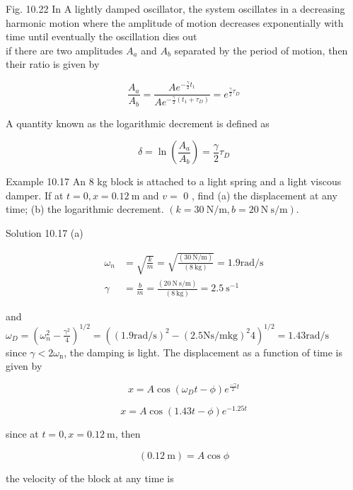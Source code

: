\documentclass[10pt]{article}
\begin{document}
Fig. 10.22 In A lightly damped oscillator, the system oscillates in a decreasing harmonic motion where the amplitude of motion decreases exponentially with time until eventually the oscillation dies out\\
if there are two amplitudes $A_{a}$ and $A_{b}$ separated by the period of motion, then their ratio is given by

$$
\frac{A_{a}}{A_{b}}=\frac{A e^{-\frac{\gamma}{2} t_{1}}}{A e^{-\frac{\gamma}{2}\left(t_{1}+\tau_{D}\right)}}=e^{\frac{\gamma}{2} \tau_{D}}
$$

A quantity known as the logarithmic decrement is defined as

$$
\delta=\ln \left(\frac{A_{a}}{A_{b}}\right)=\frac{\gamma}{2} \tau_{D}
$$

Example 10.17 An 8 kg block is attached to a light spring and a light viscous damper. If at $t=0, x=0.12 \mathrm{~m}$ and $v=$ 0 , find (a) the displacement at any time; (b) the logarithmic decrement. $(k=30 \mathrm{~N} / \mathrm{m}, b=20 \mathrm{~N} \mathrm{~s} / \mathrm{m})$.

Solution 10.17 (a)

$$
\begin{aligned}
\omega_{n} & =\sqrt{\frac{k}{m}}=\sqrt{\frac{(30 \mathrm{~N} / \mathrm{m})}{(8 \mathrm{~kg})}}=1.9 \mathrm{rad} / \mathrm{s} \\
\gamma & =\frac{b}{m}=\frac{(20 \mathrm{~N} \mathrm{~s} / \mathrm{m})}{(8 \mathrm{~kg})}=2.5 \mathrm{~s}^{-1}
\end{aligned}
$$

and\\
$\omega_{D}=\left(\omega_{n}^{2}-\frac{\gamma^{2}}{4}\right)^{1 / 2}=\left((1.9 \mathrm{rad} / \mathrm{s})^{2}-(2.5 \mathrm{Ns} / \mathrm{m} \mathrm{kg})^{2} 4\right)^{1 / 2}=1.43 \mathrm{rad} / \mathrm{s}$\\
since $\gamma<2 \omega_{\mathrm{n}}$, the damping is light. The displacement as a function of time is given by

$$
x=A \cos \left(\omega_{D} t-\phi\right) e^{\frac{-\gamma}{2} t}
$$

$$
x=A \cos (1.43 t-\phi) e^{-1.25 t}
$$

since at $t=0, x=0.12 \mathrm{~m}$, then


\begin{equation*}
(0.12 \mathrm{~m})=A \cos \phi \tag{10.17}
\end{equation*}


the velocity of the block at any time is
\end{document}
